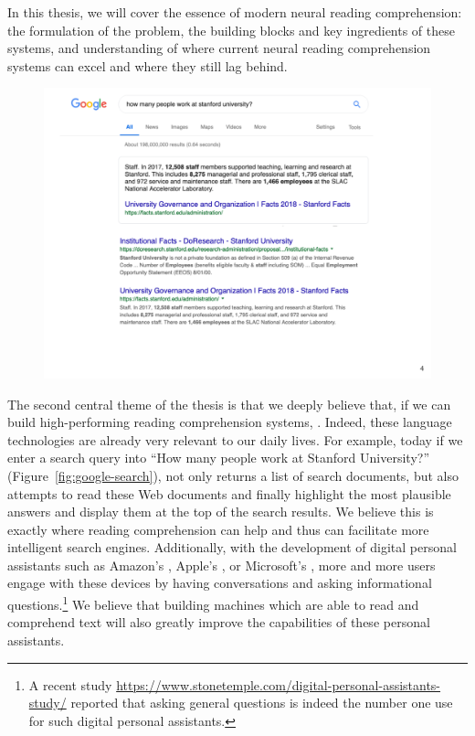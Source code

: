 In this thesis, we will cover the essence of modern neural reading comprehension: the formulation of the problem, the building blocks and key ingredients of these systems, and understanding of where current neural reading comprehension systems can excel and where they still lag behind.

\begin{figure}[!t]
    \center
    \includegraphics[scale=0.5]{img/google_search.pdf}
\end{figure}

The second central theme of the thesis is that we deeply believe that, if we can build high-performing reading comprehension systems, . Indeed, these language technologies are already very relevant to our daily lives. For example, today if we enter a search query into  ``How many people work at Stanford University?'' (Figure~\ref{fig:google-search}),  not only returns a list of search documents, but also attempts to read these Web documents and finally highlight the most plausible answers and display them at the top of the search results. We believe this is exactly where reading comprehension can help and thus can facilitate more intelligent search engines. Additionally, with the development of digital personal assistants such as Amazon's , Apple's ,  or Microsoft's , more and more users engage with these devices by having conversations and asking informational questions.\footnote{A recent study \href{https://www.stonetemple.com/digital-personal-assistants-study/}{https://www.stonetemple.com/digital-personal-assistants-study/} reported that asking general questions is indeed the number one use for such digital personal assistants.} We believe that building machines which are able to read and comprehend text will also greatly improve the capabilities of these personal assistants.

